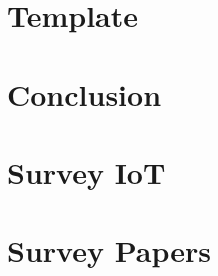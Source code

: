 \documentclass[conference]{IEEEtran}
\begin{document}
\begin{refsection}
\chapter[07:''la patience fait fondre le marbre'' -- Amer]{Template}
\chapter[09:''Everything that has a beginning has an ending. Make your peace with that and all will be well'' - Jack Kornfield]{Conclusion}
\Appendix
\chapter[A:''In any conflict, discover the one who rubs his hands ... You'll see that it's never the one who fights !''  - Marc Roussel]{Survey IoT}
	\onecolumn
\chapter[A:''In any conflict, discover the one who rubs his hands ... You'll see that it's never the one who fights !''  - Marc Roussel]{Survey Papers}
	

\end{refsection}
\end{document}
